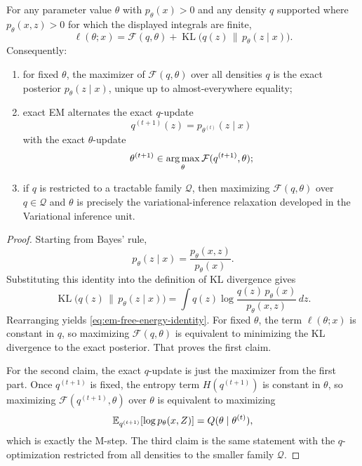 \documentclass[11pt]{article}
\begin{document}
\begin{proposition}
\label{prop:em-free-energy-coordinate-ascent}
For any parameter value $\theta$ with $p_\theta(x)>0$ and any density $q$ supported where $p_\theta(x,z)>0$ for which the displayed integrals are finite,
\begin{equation}
  \ell(\theta;x)
  =
  \mathcal{F}(q,\theta)
  +
  \operatorname{KL}\!\bigl(q(z)\,\|\,p_\theta(z\mid x)\bigr).
  \label{eq:em-free-energy-identity}
\end{equation}
Consequently:
\begin{enumerate}[leftmargin=*]
  \item for fixed $\theta$, the maximizer of $\mathcal{F}(q,\theta)$ over all densities $q$ is the exact posterior $p_\theta(z\mid x)$, unique up to almost-everywhere equality;
  \item exact EM alternates the exact $q$-update
  \[
    q^{(t+1)}(z)=p_{\theta^{(t)}}(z\mid x)
  \]
  with the exact $\theta$-update
  \[
    \theta^{(t+1)}\in\operatorname*{arg\,max}_\theta \mathcal{F}(q^{(t+1)},\theta);
  \]
  \item if $q$ is restricted to a tractable family $\mathcal{Q}$, then maximizing $\mathcal{F}(q,\theta)$ over $q\in\mathcal{Q}$ and $\theta$ is precisely the variational-inference relaxation developed in the Variational inference unit.
\end{enumerate}
\end{proposition}

\begin{proof}
Starting from Bayes' rule,
\[
p_\theta(z\mid x)=\frac{p_\theta(x,z)}{p_\theta(x)}.
\]
Substituting this identity into the definition of KL divergence gives
\[
\operatorname{KL}\!\bigl(q(z)\,\|\,p_\theta(z\mid x)\bigr)
=
\int q(z)\log \frac{q(z)\,p_\theta(x)}{p_\theta(x,z)}\,dz.
\]
Rearranging yields \eqref{eq:em-free-energy-identity}.
For fixed $\theta$, the term $\ell(\theta;x)$ is constant in $q$, so maximizing $\mathcal{F}(q,\theta)$ is equivalent to minimizing the KL divergence to the exact posterior.
That proves the first claim.

For the second claim, the exact $q$-update is just the maximizer from the first part.
Once $q^{(t+1)}$ is fixed, the entropy term $H(q^{(t+1)})$ is constant in $\theta$, so maximizing $\mathcal{F}(q^{(t+1)},\theta)$ over $\theta$ is equivalent to maximizing
\[
\mathbb{E}_{q^{(t+1)}}[\log p_\theta(x,Z)]
=
Q(\theta\mid \theta^{(t)}),
\]
which is exactly the M-step.
The third claim is the same statement with the $q$-optimization restricted from all densities to the smaller family $\mathcal{Q}$.
\end{proof}
\end{document}
